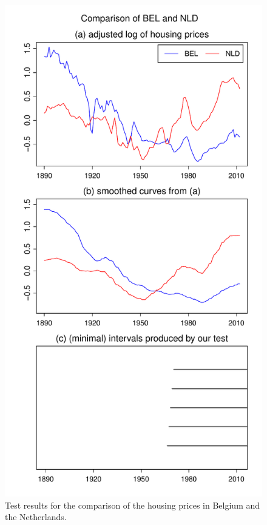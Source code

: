 \documentclass[a4paper,12pt]{article}
\begin{document}
\begin{figure}[t!]
\begin{minipage}[t]{0.49\textwidth}
\includegraphics[width=\textwidth]{Plots/hp/hp_BEL_vs_NLD}
\caption{Test results for the comparison of the housing prices in Belgium and the Netherlands.}\label{fig:hp:Belgium:Netherlands}
\end{minipage}

\end{figure}
\end{document}
